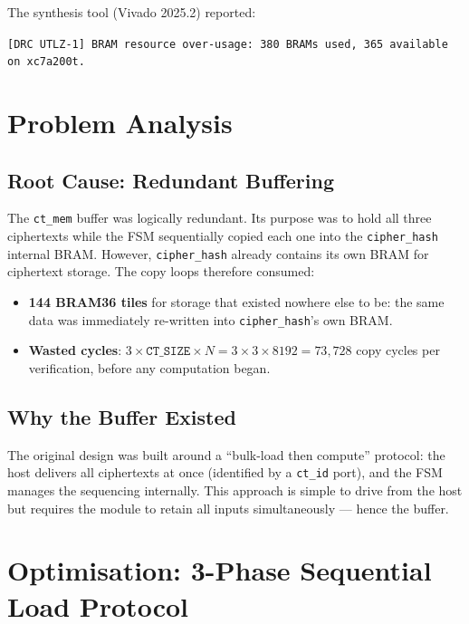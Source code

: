 \documentclass[12pt, a4paper]{article}
\begin{document}
The synthesis tool (Vivado 2025.2) reported:
\begin{center}
\texttt{[DRC UTLZ-1] BRAM resource over-usage: 380 BRAMs used,
365 available on xc7a200t.}
\end{center}

\section{Problem Analysis}
\label{sec:problem}

\subsection{Root Cause: Redundant Buffering}

The \texttt{ct\_mem} buffer was logically redundant. Its purpose was
to hold all three ciphertexts while the FSM sequentially copied each
one into the \texttt{cipher\_hash} internal BRAM. However,
\texttt{cipher\_hash} already contains its own BRAM for ciphertext
storage. The copy loops therefore consumed:

\begin{itemize}
  \item \textbf{144 BRAM36 tiles} for storage that existed nowhere else to
        be: the same data was immediately re-written into
        \texttt{cipher\_hash}'s own BRAM.
  \item \textbf{Wasted cycles}: $3 \times \texttt{CT\_SIZE} \times N
        = 3 \times 3 \times 8192 = 73{,}728$ copy cycles per
        verification, before any computation began.
\end{itemize}

\subsection{Why the Buffer Existed}

The original design was built around a ``bulk-load then compute''
protocol: the host delivers all ciphertexts at once (identified by a
\texttt{ct\_id} port), and the FSM manages the sequencing internally.
This approach is simple to drive from the host but requires the module
to retain all inputs simultaneously — hence the buffer.

\section{Optimisation: 3-Phase Sequential Load Protocol}
\label{sec:optimisation}
\end{document}
